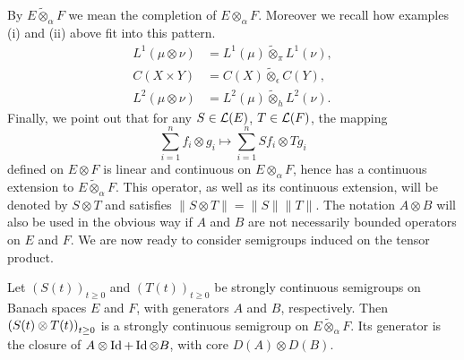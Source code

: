 By $E \widetilde{\otimes}_{\alpha} F$ we mean the completion of\/ $E \otimes_{\alpha} F$. 
Moreover we recall how examples (i) and (ii) above fit into this pattern.
\begin{align*}
    L^{1}(\mu \otimes \nu) &= L^{1}(\mu) \widetilde{\otimes}_{\pi} L^{1}(\nu), \\
    C(X \times Y)          &= C(X) \widetilde{\otimes}_{\epsilon} C(Y),          \\
    L^{2}(\mu \otimes \nu) &= L^{2}(\mu) \widetilde{\otimes}_{h} L^{2}(\nu).
\end{align*}
Finally, we point out that for any $S \in \mathcal{L}(E)$, $T \in \mathcal{L}(F) $, the mapping
\[
    \sum_{i=1}^{n}f_{i} \otimes g_{i} \mapsto \sum_{i=1}^{n}Sf_{i} \otimes Tg_{i}
\]
defined on $E \otimes F$ is linear and continuous on $E \otimes_{\alpha} F$, hence has a continuous extension to $ E \widetilde{\otimes}_{\alpha} F$. 
This operator, as well as its continuous extension, will be denoted by $S \otimes T$ and satisfies $\|S \otimes T\| = \|S\| \|T\|$. 
The notation $A \otimes B$ will also be used in the obvious way if\/ $A$ and $B$ are not necessarily bounded operators on $E$ and $F$. 
We are now ready to consider semigroups induced on the tensor product.
\begin{proposition*}\label{prop:a1-3.7}
Let $(S(t))_{t\geq 0}$ and $(T(t))_{t\geq 0}$ be strongly continuous semigroups on Banach spaces $E$ and $F$, with generators $A$ and $B$, 
respectively.
Then $\mleft(S(t) \otimes T(t)\mright)_{t\geq 0}$ is a strongly continuous 
semigroup on $E\widetilde{\otimes}_{\alpha}F$.
Its generator is the closure of $A \otimes \operatorname{Id} + \operatorname{Id} \otimes B$, with 
core $D(A) \otimes D(B)$.
\end{proposition*}
